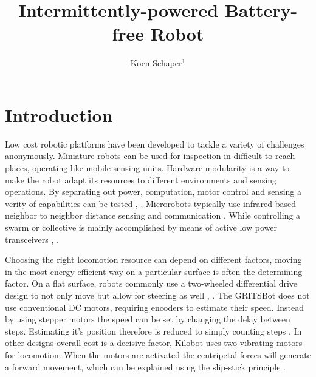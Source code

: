 \documentclass[letterpaper, 10 pt, conference]{ieeeconf}  %
\title{\LARGE \bf
Intermittently-powered Battery-free Robot
}
\author{Koen Schaper$^{1}$ %
}
\begin{document}
\maketitle
\thispagestyle{empty}
\pagestyle{empty}






\section{Introduction}



Low cost robotic platforms have been developed to tackle a variety of challenges anonymously.
Miniature robots can be used for inspection in difficult to reach places, operating like mobile sensing units.
Hardware modularity is a way to make the robot adapt its resources to different environments and sensing operations.
By separating out power, computation, motor control and sensing a verity of capabilities can be tested \cite{sabelhaus_icra_2013}, \cite{pickem_icra_2015}.
Microrobots typically use infrared-based neighbor to neighbor distance sensing and communication \cite{rubenstein_icra_2012}.
While controlling a swarm or collective is mainly accomplished by means of active low power transceivers \cite{sabelhaus_icra_2013}, \cite{pickem_icra_2015}. 


Choosing the right locomotion resource can depend on different factors, moving in the most energy efficient way on a particular surface is often the determining factor.
On a flat surface, robots commonly use a two-wheeled differential drive design to not only move but allow for steering as well \cite{sabelhaus_icra_2013}, \cite{pickem_icra_2015}.
The GRITSBot does not use conventional DC motors, requiring encoders to estimate their speed. 
Instead by using stepper motors the speed can be set by changing the delay between steps. 
Estimating it's position therefore is reduced to simply counting steps \cite{pickem_icra_2015}.  
In other designs overall cost is a decisive factor, Kilobot uses two vibrating motors for locomotion.
When the motors are activated the centripetal forces will generate a forward movement, which can be explained using the slip-stick principle \cite{rubenstein_icra_2012}.
\end{document}
